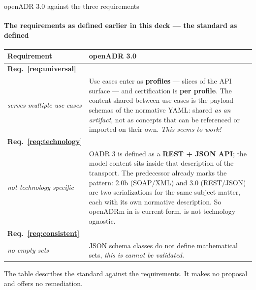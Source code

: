 \begin{frame}{openADR 3.0 against the three requirements}
  \framesubtitle{The requirements as defined earlier in this deck — the standard as defined}

  \scriptsize
  \setlength{\tabcolsep}{5pt}
  \renewcommand{\arraystretch}{1.35}
  \begin{center}
  \begin{tabular}{@{}p{3.2cm}p{11.8cm}@{}}
    \rowcolor[HTML]{031d44}
    {\color{white}\textbf{Requirement}} &
    {\color{white}\textbf{openADR 3.0}}\\
    \midrule
    \textbf{Req.\ \ref{req:universal}}\\ \textit{serves multiple use cases} &
      Use cases enter as \textbf{profiles} — slices of the API surface — and
      certification is \textbf{per profile}. The content shared between use
      cases is the payload schemas of the normative YAML: shared
      \emph{as an artifact}, not as concepts that can be referenced or
      imported on their own. \emph{This seems to work!}\\
    \textbf{Req.\ \ref{req:technology}}\\ \textit{not technology-specific} &
      OADR 3 is defined as a \textbf{REST + JSON API}; the model content
      sits inside that description of the transport. The predecessor
      already marks the pattern: 2.0b (SOAP/XML) and 3.0 (REST/JSON) are
      two serializations for the same subject matter, each with its own normative
      description. So openADRm in is current form, is not technology agnostic.\\
    \textbf{Req.\ \ref{req:consistent}}\\ \textit{no empty sets} &
      JSON schema classes do not define mathematical sets, \emph{this is cannot be validated.} \\
    
    \bottomrule
  \end{tabular}
  \end{center}

  \vspace{0.2cm}
  \begin{center}
  {\footnotesize The table describes the standard against the requirements.
  It makes no proposal and offers no remediation.}
  \end{center}
\end{frame}
